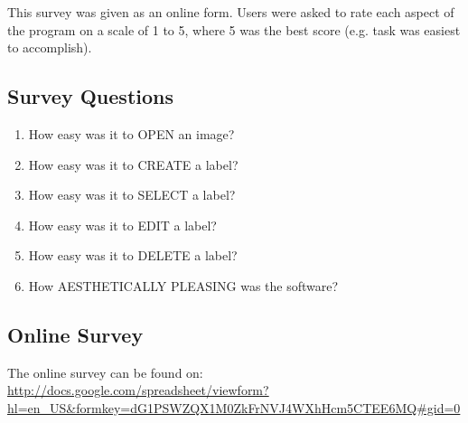 \documentclass[11pt,twocolumn]{article}
\begin{document}
This survey was given as an online form. Users were asked to rate each aspect of the program on a scale of 1 to 5, where 5 was the best score (e.g. task was easiest to accomplish). 

\subsection{Survey Questions}

\begin{enumerate}
\item How easy was it to OPEN an image? 
\item How easy was it to CREATE a label?
\item How easy was it to SELECT a label?
\item How easy was it to EDIT a label? 
\item How easy was it to DELETE a label?
\item How AESTHETICALLY PLEASING was the software?
\end{enumerate}

\subsection{Online Survey}

The online survey can be found on:\\ \url{http://docs.google.com/spreadsheet/viewform?hl=en_US&formkey=dG1PSWZQX1M0ZkFrNVJ4WXhHcm5CTEE6MQ#gid=0}
\end{document}

